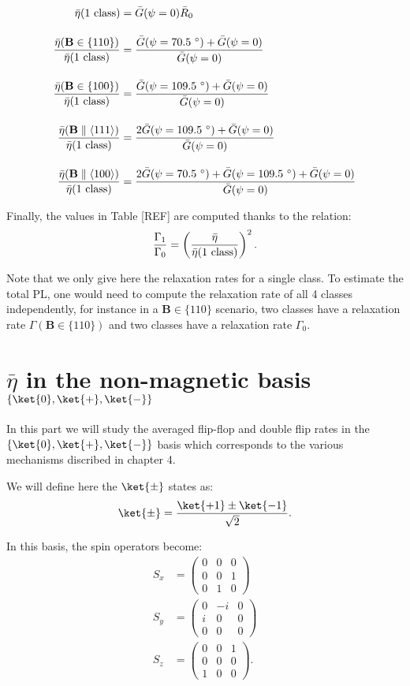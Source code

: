 \documentclass[a4paper, 11pt]{book}
\begin{document}
\begin{align}
\bar \eta(\rm{1\ class})&=\bar G(\psi=0) \bar R_0 \\[1em]
\frac{\bar \eta(\mathbf{B} \in \{110\})}{\bar \eta(\rm{1\ class})}&= \frac{\bar G(\psi=70.5 \ ^\circ)+ \bar G(\psi=0)}{\bar G(\psi=0)}\\[1em]
\frac{\bar \eta(\mathbf{B} \in \{100\})}{\bar \eta(\rm{1\ class})}&= \frac{\bar G(\psi=109.5 \ ^\circ)+ \bar G(\psi=0)}{\bar G(\psi=0)}\\[1em]
\frac{\bar \eta(\mathbf{B} \parallel \langle 111 \rangle)}{\bar \eta(\rm{1\ class})}&= \frac{2\bar G(\psi=109.5 \ ^\circ)+ \bar G(\psi=0)}{\bar G(\psi=0)}\\[1em]
\frac{\bar \eta(\mathbf{B} \parallel \langle 100 \rangle)}{\bar \eta(\rm{1\ class})}&= \frac{2\bar G(\psi=70.5 \ ^\circ)+ \bar G(\psi=109.5 \ ^\circ) + \bar G(\psi=0)}{\bar G(\psi=0)}
\end{align} 

Finally, the values in Table [REF] are computed thanks to the relation: \begin{equation}
\frac{\Gamma_1}{\Gamma_0}= \left(\frac{\bar \eta}{\bar \eta(\rm{1\ class})} \right)^2.
\end{equation}

Note that we only give here the relaxation rates for a single class. To estimate the total PL, one would need to compute the relaxation rate of all 4 classes independently, for instance in a $\mathbf{B} \in \{110\}$ scenario, two classes have a relaxation rate $\Gamma(\mathbf{B} \in \{110\})$ and two classes have a relaxation rate $\Gamma_0$.

\section{$\bar \eta$ in the non-magnetic basis $\{ \ket{0}, \ket{+}, \ket{-}\}$}

In this part we will study the averaged flip-flop and double flip rates in the $\{ \ket{0}, \ket{+}, \ket{-}\}$ basis which corresponds to the various mechanisms discribed in chapter 4.

We will define here the $\ket{\pm}$ states as:
\begin{equation}
\ket{\pm}=\frac{\ket{+1}\pm\ket{-1}}{\sqrt{2}}.
\end{equation}

In this basis, the spin operators become:
\begin{align*}
S_x&=\begin{pmatrix}
0&0&0 \\
0&0&1 \\
0&1&0
\end{pmatrix} \\
S_y&=\begin{pmatrix}
0&-i&0 \\
i&0&0 \\
0&0&0
\end{pmatrix} \\
S_z&=\begin{pmatrix}
0&0&1 \\
0&0&0 \\
1&0&0
\end{pmatrix}.
\end{align*}
\end{document}
